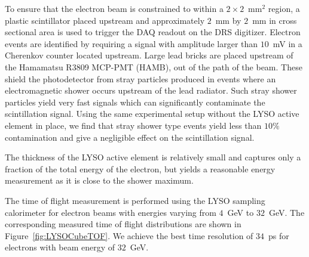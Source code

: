 To ensure that the electron beam is constrained to within a $2\times 2$~mm$^2$ region, 
a plastic scintillator placed upstream and approximately $2$~mm by $2$~mm in cross sectional 
area is used to trigger the DAQ readout on the DRS  digitizer. Electron events are identified 
by requiring a signal with amplitude larger than $10$~mV in a Cherenkov counter located 
upstream. Large lead bricks are placed upstream of the Hamamatsu R3809 MCP-PMT (HAMB),
out of the path of the beam. These shield the photodetector from stray particles
produced in events where an electromagnetic shower occurs upstream of the lead
radiator. Such stray shower particles yield very fast signals which can
significantly contaminate the scintillation signal. Using the same experimental
setup without the LYSO active element in place, we find that stray shower type
events yield less than $10\%$ contamination and give a negligible effect on the
scintillation signal. 


The thickness of the LYSO active element is relatively small and captures only a fraction 
of the total energy of the electron, but yields a reasonable energy measurement
as it is close to the shower maximum.

The time of flight measurement is performed using the LYSO sampling calorimeter
for electron beams with energies varying from $4$~GeV to $32$~GeV. The corresponding 
measured time of flight distributions are shown in Figure~\ref{fig:LYSOCubeTOF}.
We achieve the best time resolution of $34$~ps for electrons
with beam energy of $32$~GeV.

